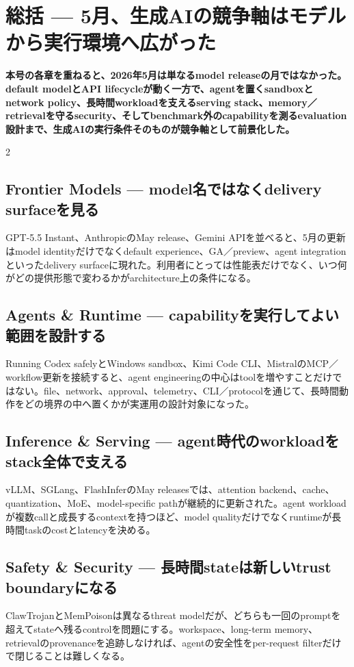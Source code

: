 \section{総括 — 5月、生成AIの競争軸はモデルから実行環境へ広がった}
\label{sec:retrospective-synthesis}
\noindent\textbf{本号の各章を重ねると、2026年5月は単なるmodel releaseの月ではなかった。default modelとAPI lifecycleが動く一方で、agentを置くsandboxとnetwork policy、長時間workloadを支えるserving stack、memory／retrievalを守るsecurity、そしてbenchmark外のcapabilityを測るevaluation設計まで、生成AIの実行条件そのものが競争軸として前景化した。}
\medskip
\begin{multicols}{2}
\subsection{Frontier Models — model名ではなくdelivery surfaceを見る}
GPT-5.5 Instant、AnthropicのMay release、Gemini APIを並べると、5月の更新はmodel identityだけでなくdefault experience、GA／preview、agent integrationといったdelivery surfaceに現れた。利用者にとっては性能表だけでなく、いつ何がどの提供形態で変わるかがarchitecture上の条件になる。 \cite{src-01a8b52eee81,src-f6aa679babd7,src-a24fd97eb3d0}

\subsection{Agents \& Runtime — capabilityを実行してよい範囲を設計する}
Running Codex safelyとWindows sandbox、Kimi Code CLI、MistralのMCP／workflow更新を接続すると、agent engineeringの中心はtoolを増やすことだけではない。file、network、approval、telemetry、CLI／protocolを通じて、長時間動作をどの境界の中へ置くかが実運用の設計対象になった。 \cite{src-66be12207714,src-4a3442a5ca8c,src-9191d43918fc,src-d8b7c1c36830}

\subsection{Inference \& Serving — agent時代のworkloadをstack全体で支える}
vLLM、SGLang、FlashInferのMay releasesでは、attention backend、cache、quantization、MoE、model-specific pathが継続的に更新された。agent workloadが複数callと成長するcontextを持つほど、model qualityだけでなくruntimeが長時間taskのcostとlatencyを決める。 \cite{src-77e29e3fac8f,src-c97320147e8c,src-80b8d67933c0,src-5a693cfc6852,src-69c5523286bd,src-74a7052acd7a,src-ac04c00cf21f}

\subsection{Safety \& Security — 長時間stateは新しいtrust boundaryになる}
ClawTrojanとMemPoisonは異なるthreat modelだが、どちらも一回のpromptを超えてstateへ残るcontrolを問題にする。workspace、long-term memory、retrievalのprovenanceを追跡しなければ、agentの安全性をper-request filterだけで閉じることは難しくなる。 \cite{src-7fa0ea6bcf47,src-f216d6cd7707,src-062c2718dd96}


\end{multicols}
